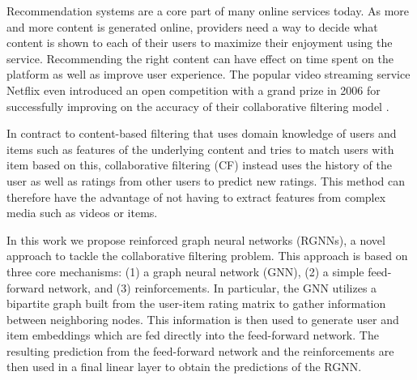Recommendation systems are a core part of many online services today. As more and more content is generated online, providers need a way to decide what content is shown to each of their users to maximize their enjoyment using the service. Recommending the right content can have effect on time spent on the platform as well as improve user experience. 
The popular video streaming service Netflix even introduced an open competition with a grand prize in 2006 for successfully improving on the accuracy of their collaborative filtering model \citep{bennett2007netflix}.

In contract to content-based filtering that uses domain knowledge of users and items such as features of the underlying content and tries to match users with item based on this, collaborative filtering (CF) instead uses the history of the user as well as ratings from other users to predict new ratings. This method can therefore have the advantage of not having to extract features from complex media such as videos or items.

In this work we propose reinforced graph neural networks (RGNNs), a novel approach to tackle the collaborative filtering problem. This approach is based on three core mechanisms: (1) a graph neural network (GNN), (2) a simple feed-forward network, and (3) reinforcements. In particular, the GNN utilizes a bipartite graph built from the user-item rating matrix to gather information between neighboring nodes. This information is then used to generate user and item embeddings which are fed directly into the feed-forward network. The resulting prediction from the feed-forward network and the reinforcements are then used in a final linear layer to obtain the predictions of the RGNN.
